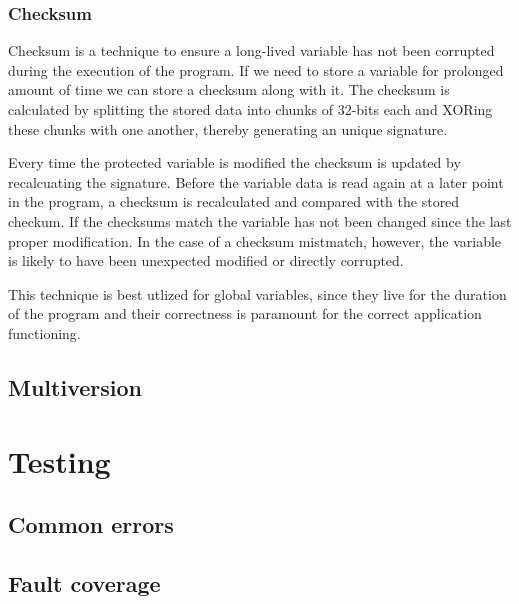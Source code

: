 \documentclass[12pt, letterpaper]{article}
\begin{document}
\subsubsection{Checksum}

Checksum is a technique to ensure a long-lived variable has not been corrupted during the execution of the program. If we need to store a variable for prolonged amount of time we can store a checksum along with it. The checksum is calculated by splitting the stored data into chunks of 32-bits each and XORing these chunks with one another, thereby generating an unique signature.

Every time the protected variable is modified the checksum is updated by recalcuating the signature. Before the variable data is read again at a later point in the program, a checksum is recalculated and compared with the stored checkum. If the checksums match the variable has not been changed since the last proper modification. In the case of a checksum mistmatch, however, the variable is likely to have been unexpected modified or directly corrupted.

This technique is best utlized for global variables, since they live for the duration of the program and their correctness is paramount for the correct application functioning. 


\clearpage
\subsection{Multiversion}

\section{Testing}

\subsection{Common errors}

\subsection{Fault coverage}

\newpage
\printbibliography
\end{document}
